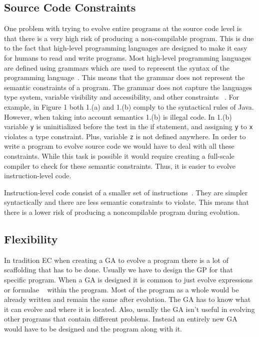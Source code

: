 \documentclass{sig-alternate}
\begin{document}
\subsection{Source Code Constraints}
One problem with trying to evolve entire programs at the source code level is that there is a very high risk of producing a non-compilable program. This is due to the fact that high-level programming languages are designed to make it easy for humans to read and write programs. Most high-level programming languages are defined using grammars which are used to represent the syntax of the programming language~\cite{Oracle:2013,Assembly:2010}. This means that the grammar does not represent the semantic constraints of a program. The grammar does not capture the languages type system, variable visibility and accessibility, and other constraints ~\cite{FINCH:2011}. For example, in Figure 1 both 1.(a) and 1.(b) comply to the syntactical rules of Java. However, when taking into account semantics 1.(b) is illegal code. In 1.(b) variable \texttt{y} is uninitialized before the test in the if statement, and assigning \texttt{y} to \texttt{x} violates a type constraint. Plus, variable \texttt{z} is not defined anywhere.  In order to write a program to evolve source code we would have to deal with all these constraints. While this task is possible it would require creating a full-scale compiler to check for these semantic constraints. Thus, it is easier to evolve instruction-level code. \par

Instruction-level code consist of a smaller set of instructions~\cite{Assembly:2010}. They are simpler syntactically and there are less semantic constraints to violate. This means that there is a lower risk of producing a noncompilable program during evolution. 

\subsection{Flexibility}
In tradition EC when creating a GA to evolve a program there is a lot of scaffolding that has to be done. Usually we have to design the GP for that specific program. When a GA is designed it is common to just evolve expressions or formulae ~\cite{FINCH:2011} within the program. Most of the program as a whole would be already written and remain the same after evolution. The GA has to know what it can evolve and where it is located. Also, usually the GA isn't useful in evolving other programs that contain different problems. Instead an entirely new GA would have to be designed and the program along with it.
\end{document}

